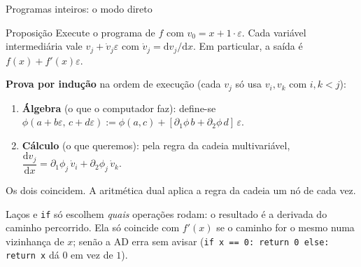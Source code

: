 \documentclass[aspectratio=169,11pt]{beamer}
\begin{document}
\begin{frame}{Programas inteiros: o modo direto}
  \begin{block}{Proposição}
    Execute o programa de $f$ com $v_0 = x + 1\cdot\varepsilon$. Cada variável intermediária vale $v_j + \dot v_j\varepsilon$ com $\dot v_j = \mathrm dv_j/\mathrm dx$. Em particular, a saída é $f(x)+f'(x)\varepsilon$.
  \end{block}
  \textbf{Prova por indução} na ordem de execução (cada $v_j$ só usa $v_i,v_k$ com $i,k<j$):
  \begin{enumerate}
    \item \textbf{Álgebra} (o que o computador faz): define-se
      $\phi(a+b\varepsilon,\,c+d\varepsilon) := \phi(a,c) + [\partial_1\phi\, b + \partial_2\phi\, d]\,\varepsilon$.
    \item \textbf{Cálculo} (o que queremos): pela regra da cadeia multivariável,
      $\dfrac{\mathrm dv_j}{\mathrm dx} = \partial_1\phi_j\,\dot v_i + \partial_2\phi_j\,\dot v_k$.
  \end{enumerate}
  Os dois coincidem. \alert{A aritmética dual aplica a regra da cadeia um nó de cada vez.}
  \vspace{0.4em}

  {\small Laços e \texttt{if} só escolhem \emph{quais} operações rodam: o resultado é a derivada do caminho percorrido. Ela só coincide com $f'(x)$ se o caminho for o mesmo numa vizinhança de $x$; senão a AD erra sem avisar (\texttt{if x == 0: return 0 else: return x} dá $0$ em vez de $1$).}
\end{frame}
\end{document}
